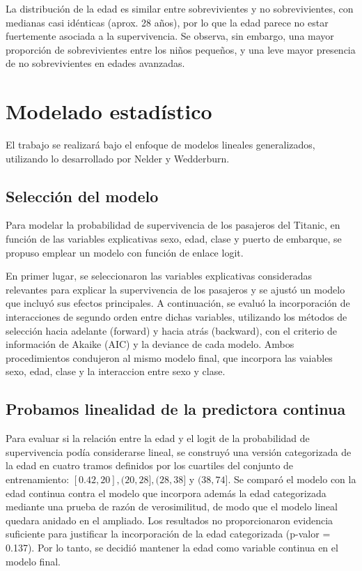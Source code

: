 \documentclass[
  spanish,
  11pt,
  letterpaper,
  DIV=11,
  numbers=noendperiod]{scrartcl}
\begin{document}
La distribución de la edad es similar entre sobrevivientes y no
sobrevivientes, con medianas casi idénticas (aprox. 28 años), por lo que
la edad parece no estar fuertemente asociada a la supervivencia. Se
observa, sin embargo, una mayor proporción de sobrevivientes entre los
niños pequeños, y una leve mayor presencia de no sobrevivientes en
edades avanzadas.

\section{Modelado estadístico}\label{modelado-estaduxedstico}

El trabajo se realizará bajo el enfoque de modelos lineales
generalizados, utilizando lo desarrollado por Nelder y Wedderburn.

\subsection{Selección del modelo}\label{selecciuxf3n-del-modelo}

Para modelar la probabilidad de supervivencia de los pasajeros del
Titanic, en función de las variables explicativas sexo, edad, clase y
puerto de embarque, se propuso emplear un modelo con función de enlace
logit.

En primer lugar, se seleccionaron las variables explicativas
consideradas relevantes para explicar la supervivencia de los pasajeros
y se ajustó un modelo que incluyó sus efectos principales. A
continuación, se evaluó la incorporación de interacciones de segundo
orden entre dichas variables, utilizando los métodos de selección hacia
adelante (forward) y hacia atrás (backward), con el criterio de
información de Akaike (AIC) y la deviance de cada modelo. Ambos
procedimientos condujeron al mismo modelo final, que incorpora las
vaiables sexo, edad, clase y la interaccion entre sexo y clase.

\subsection{Probamos linealidad de la predictora
continua}\label{probamos-linealidad-de-la-predictora-continua}

Para evaluar si la relación entre la edad y el logit de la probabilidad
de supervivencia podía considerarse lineal, se construyó una versión
categorizada de la edad en cuatro tramos definidos por los cuartiles del
conjunto de entrenamiento: \([0.42, 20], (20, 28], (28, 38]\) y
\((38, 74]\). Se comparó el modelo con la edad continua contra el modelo
que incorpora además la edad categorizada mediante una prueba de razón
de verosimilitud, de modo que el modelo lineal quedara anidado en el
ampliado. Los resultados no proporcionaron evidencia suficiente para
justificar la incorporación de la edad categorizada (p-valor = 0.137).
Por lo tanto, se decidió mantener la edad como variable continua en el
modelo final.
\end{document}
